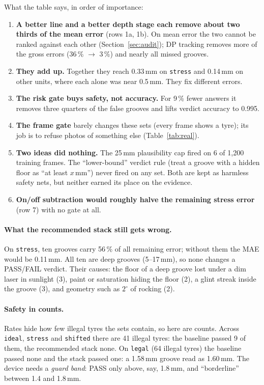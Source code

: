 What the table says, in order of importance:
\begin{enumerate}
\item \textbf{A better line and a better depth stage each remove about two thirds of the mean error} (rows 1a, 1b).
      On mean error the two cannot be ranked against each other (Section~\ref{sec:audit}); DP tracking removes more of
      the gross errors (36\,\% $\to$ 3\,\%) and nearly all missed grooves.
\item \textbf{They add up.} Together they reach 0.33\,mm on \texttt{stress} and 0.14\,mm on other
      units, where each alone was near 0.5\,mm. They fix different errors.
\item \textbf{The risk gate buys safety, not accuracy.} For 9\,\% fewer answers it removes three quarters of the
      false grooves and lifts verdict accuracy to 0.995.
\item \textbf{The frame gate} barely changes these sets (every frame shows a tyre); its job is to refuse photos of
      something else (Table~\ref{tab:real}).
\item \textbf{Two ideas did nothing.} The 25\,mm plausibility cap fired on 6 of 1{,}200 training frames. The
      ``lower-bound'' verdict rule (treat a groove with a hidden floor as ``at least $x$\,mm'') never fired on any
      set. Both are kept as harmless safety nets, but neither earned its place on the evidence.
\item \textbf{On/off subtraction would roughly halve the remaining stress error} (row 7) with no gate at all.
\end{enumerate}

\paragraph{What the recommended stack still gets wrong.} On \texttt{stress}, ten grooves carry 56\,\% of all
remaining error; without them the MAE would be 0.11\,mm. All ten are deep grooves (5--17\,mm), so none changes a
PASS/FAIL verdict. Their causes: the floor of a deep groove lost under a dim laser in sunlight (3), paint or
saturation hiding the floor (2), a glint streak inside the groove (3), and geometry such as $2^\circ$ of rocking (2).
\paragraph{Safety in counts.} Rates hide how few illegal tyres the sets contain, so here are counts. Across
\texttt{ideal}, \texttt{stress} and \texttt{shifted} there are 41 illegal tyres: the baseline passed 9 of them, the
recommended stack none. On \texttt{legal} (64 illegal tyres) the baseline passed none and the stack passed one: a
1.58\,mm groove read as 1.60\,mm. The device needs a
\emph{guard band}: PASS only above, say, 1.8\,mm, and ``borderline'' between 1.4 and 1.8\,mm.

